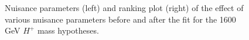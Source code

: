 \begin{figure}[H]
  \centering
  \caption{Nuisance parameters (left) and ranking plot (right) of the effect of various nuisance parameters before and after the fit for the 1600 GeV $H^{+}$ mass hypotheses.}
\end{figure}
